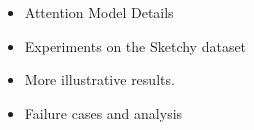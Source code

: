 \documentclass[runningheads]{llncs}
\begin{document}
\begin{itemize}
  \item
  Attention Model Details 

  \item 
  	Experiments on the Sketchy dataset

   \item
    More illustrative results.
  \item 
  Failure cases and analysis
  
 \end{itemize}
\end{document}
